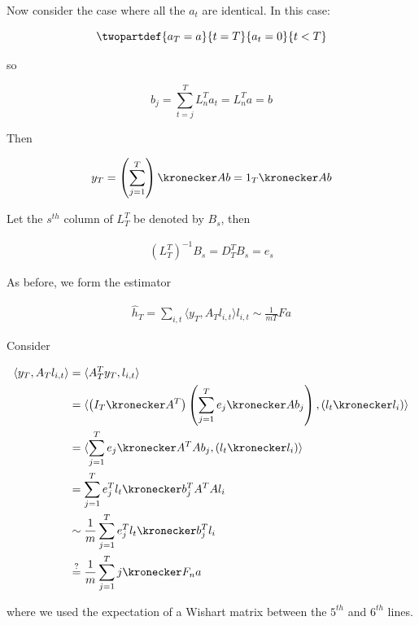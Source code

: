 \begin{example}
Now consider the case where all the \(a_t\) are identical. In this case:

\begin{equation}
\twopartdef{a_T = a}{t=T}{a_t = 0}{t < T}
\end{equation}

so

\begin{equation}
b_j = \sum_{t=j}^T L_n^T a_t = L_n^T a = b
\end{equation}

Then

\begin{equation}
y_T = \left( \sum_{j=1}^T \right) \kronecker Ab = 1_T \kronecker Ab
\end{equation}
\end{example}

Let the \(s^{th}\) column of \(L_T^T\) be denoted by \(B_s\), then

\begin{align*}
\left(L_T^T\right)^{-1}B_s = D_T^T B_s = e_s
\end{align*}

As before, we form the estimator

\begin{align*}
\hat{h}_T = \sum_{i,t} \langle y_T, A_T l_{i,t} \rangle l_{i,t} \sim \frac{1}{mT} Fa
\end{align*}

Consider 

\begin{align*}
\langle y_T, A_T l_{i,t} \rangle &= \langle A_T^T y_T,l_{i,t} \rangle \\
&= \langle \left(I_T \kronecker A^T\right)\left(\sum_{j=1}^T e_j \kronecker Ab_j\right), \left(l_t \kronecker l_i\right)\rangle \\
&= \langle \sum_{j=1}^T e_j \kronecker A^TAb_j, \left(l_t \kronecker l_i\right)\rangle \\
&= \sum_{j=1}^T e_j^T l_t \kronecker b_j^TA^TAl_i \\
&\sim \frac{1}{m}\sum_{j=1}^T e_j^T l_t \kronecker b_j^Tl_i\\
&\stackrel{?}{=} \frac{1}{m}\sum_{j=1}^T j \kronecker F_n a
\end{align*}

where we used the expectation of a Wishart matrix between the \(5^{th}\) and \(6^{th}\) lines.

